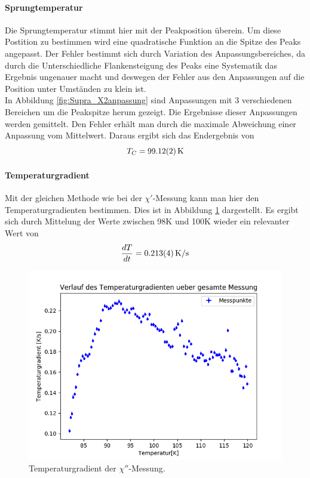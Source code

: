 \documentclass[12pt,a4paper]{article}
\begin{document}
\paragraph{Sprungtemperatur}
Die Sprungtemperatur stimmt hier mit der Peakposition überein. Um diese Postition zu bestimmen wird eine quadratische Funktion an die Spitze des Peaks angepasst. Der Fehler bestimmt sich durch Variation des Anpassungsbereiches, da durch die Unterschiedliche Flankensteigung des Peaks eine Systematik das Ergebnis ungenauer macht und deswegen der Fehler aus den Anpassungen auf die Position unter Umständen zu klein ist.\\
In Abbildung \ref{fig:Supra_X2anpassung} sind Anpassungen mit 3 verschiedenen Bereichen um die Peakspitze herum gezeigt. Die Ergebnisse dieser Anpassungen werden gemittelt. Den Fehler erhält man durch die maximale Abweichung einer Anpassung vom Mittelwert. Daraus ergibt sich das Endergebnis von
\begin{equation*}
T_C = \SI{99.12\pm 0.02}{K}
\end{equation*}

\paragraph{Temperaturgradient}
Mit der gleichen Methode wie bei der $\chi'$-Messung kann man hier den Temperaturgradienten bestimmen. Dies ist in Abbildung \ref{fig:Supra_X2temp} dargestellt. Es ergibt sich durch Mittelung der Werte zwischen 98K und 100K wieder ein relevanter Wert von 
\begin{equation*}
\dfrac{dT}{dt} = \SI{0.213\pm 0.004}{K/s}
\end{equation*}

\begin{figure}
\centering
\includegraphics[scale=0.8]{Bilder/Haupt_Supra/X2_temp.png}
\caption{Temperaturgradient der $\chi''$-Messung.}
\label{fig:Supra_X2temp}
\end{figure}
\end{document}
